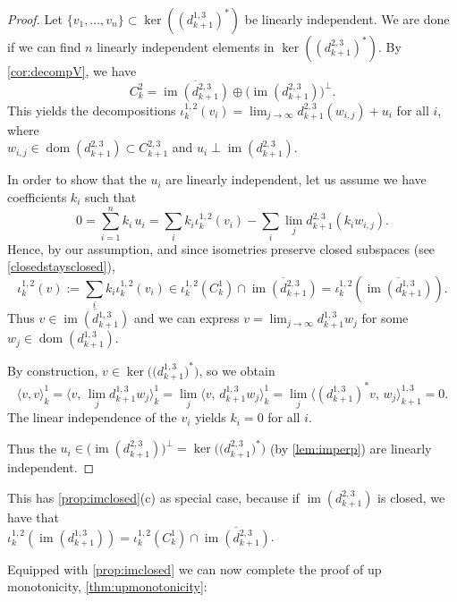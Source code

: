 \documentclass[11pt]{article}
\theoremstyle{definition}
\theoremstyle{remark}
\DeclareMathOperator\dom{dom}
\DeclareMathOperator{\im}{im}
\begin{document}
\begin{proof}
    Let $\{v_1,\dots,v_n\} \subset \ker((d_{k+1}^{1,3})^*)$ be linearly independent. We are done if we can find $n$ linearly independent elements 
    in $\ker((d_{k+1}^{2,3})^*)$. By \cref{cor:decompV}, we have
    $$
        C_k^2=\overline{\im(d_{k+1}^{2,3})} \oplus \big(\im(d_{k+1}^{2,3})\big)^\perp.
    $$
    This yields the decompositions
        $\iota_k^{1,2} (v_i)=\lim_{j \rightarrow \infty} d_{k+1}^{2,3}(w_{i,j}) + u_i$ for all $i$,
    where\\ $w_{i,j} \in \dom(d_{k+1}^{2,3})\subset C_{k+1}^{2,3}$ and $u_i \perp \im(d_{k+1}^{2,3})$.
    
    In order to show that the $u_i$ are linearly independent, let us assume we have coefficients $k_i$ such that
    $$
        0=\sum_{i=1}^n k_i \, u_i= \sum_i k_i \iota_k^{1,2} ( v_i) - \sum_i \lim_{j} d_{k+1}^{2,3}(k_i w_{i,j}).
    $$
    Hence, by our assumption, and since isometries preserve closed subspaces (see \cref{closedstaysclosed}), 
    $$
    \iota_k^{1,2} (v):=\sum_{i} k_i \iota_k^{1,2} (v_i) \in \iota_k^{1,2} (C_k^1) \cap \overline{\im(d_{k+1}^{2,3})}=\iota_k^{1,2} \left( \overline{\im(d_{k+1}^{1,3})}\right).
    $$
    Thus $v \in \overline{\im(d_{k+1}^{1,3})}$ and we can express $v=\lim_{j\rightarrow \infty} d_{k+1}^{1,3} w_j$ for some $w_j \in \dom(d_{k+1}^{1,3})$.
    
    By construction, $v\in \ker\big(\big(d_{k+1}^{1,3}\big)^*\big)$, so we obtain
    $$
        \langle v, v\rangle_k^1=\Big\langle v,\, \lim_j {d_{k+1}^{1,3} w_j}\Big\rangle_k^1 = \lim_j \Big\langle v,\, {d_{k+1}^{1,3} w_j}\Big\rangle_k^1=\lim_j \Big\langle (d_{k+1}^{1,3})^* v,\, w_j\Big\rangle_{k+1}^{1,3}=0.
    $$
    The linear independence of the $v_i$ yields $k_i=0$ for all $i$.
    
    Thus the $u_i \in \big(\im(d_{k+1}^{2,3})\big)^\perp = \ker\big(\big(d_{k+1}^{2,3}\big)^*\big)$ (by \cref{lem:imperp}) are linearly independent.
\end{proof}
This has \cref{prop:imclosed}(c) as special case, because if $\im(d_{k+1}^{2,3})$ is closed, we have that\\
$\iota_k^{1,2} (\im(d_{k+1}^{1,3}))= \iota_k^{1,2} (C_k^1) \cap \overline{\im(d_{k+1}^{2,3})}$.

Equipped with \cref{prop:imclosed} we can now complete the proof of up monotonicity, \cref{thm:upmonotonicity}:
\end{document}
